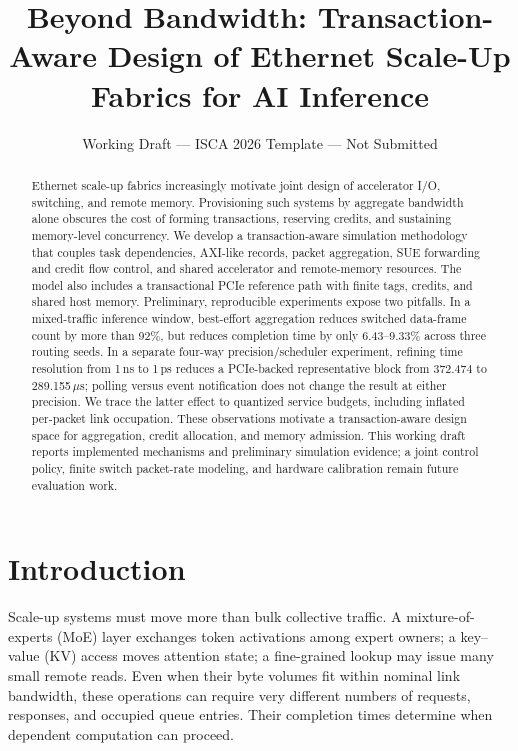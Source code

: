 \documentclass[conference]{IEEEtran}
\newcommand{\us}{\ensuremath{\mu\mathrm{s}}}
\begin{document}
\title{Beyond Bandwidth: Transaction-Aware Design of Ethernet Scale-Up Fabrics for AI Inference}
\author{\normalsize Working Draft --- ISCA 2026 Template --- Not Submitted}
\maketitle
\thispagestyle{plain}\pagestyle{plain}

\begin{abstract}
Ethernet scale-up fabrics increasingly motivate joint design of accelerator I/O, switching, and remote memory. Provisioning such systems by aggregate bandwidth alone obscures the cost of forming transactions, reserving credits, and sustaining memory-level concurrency. We develop a transaction-aware simulation methodology that couples task dependencies, AXI-like records, packet aggregation, SUE forwarding and credit flow control, and shared accelerator and remote-memory resources. The model also includes a transactional PCIe reference path with finite tags, credits, and shared host memory. Preliminary, reproducible experiments expose two pitfalls. In a mixed-traffic inference window, best-effort aggregation reduces switched data-frame count by more than 92\%, but reduces completion time by only 6.43--9.33\% across three routing seeds. In a separate four-way precision/scheduler experiment, refining time resolution from 1\,ns to 1\,ps reduces a PCIe-backed representative block from 372.474 to 289.155\,\us; polling versus event notification does not change the result at either precision. We trace the latter effect to quantized service budgets, including inflated per-packet link occupation. These observations motivate a transaction-aware design space for aggregation, credit allocation, and memory admission. This working draft reports implemented mechanisms and preliminary simulation evidence; a joint control policy, finite switch packet-rate modeling, and hardware calibration remain future evaluation work.
\end{abstract}

\section{Introduction}
Scale-up systems must move more than bulk collective traffic. A mixture-of-experts (MoE) layer exchanges token activations among expert owners; a key--value (KV) access moves attention state; a fine-grained lookup may issue many small remote reads. Even when their byte volumes fit within nominal link bandwidth, these operations can require very different numbers of requests, responses, and occupied queue entries. Their completion times determine when dependent computation can proceed.
\end{document}
